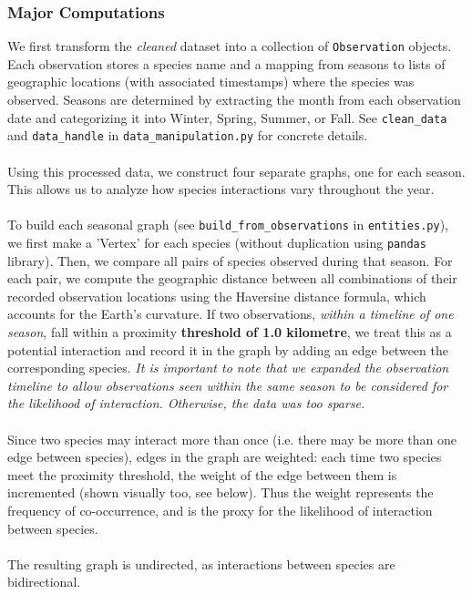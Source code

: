 \documentclass{article}
\begin{document}
\subsubsection{Major Computations}  
We first transform the \textit{cleaned} dataset into a collection of \texttt{Observation} objects. Each observation stores a species name and a mapping from seasons to lists of geographic locations (with associated timestamps) where the species was observed. Seasons are determined by extracting the month from each observation date and categorizing it into Winter, Spring, Summer, or Fall. See \texttt{clean\_data} and \texttt{data\_handle} in \texttt{data\_manipulation.py} for concrete details. \\ \\
Using this processed data, we construct four separate graphs, one for each season. This allows us to analyze how species interactions vary throughout the year.\\ \\
To build each seasonal graph (see \texttt{build\_from\_observations} in \texttt{entities.py}), we first make a 'Vertex' for each species (without duplication using \texttt{pandas} library). Then, we compare all pairs of species observed during that season. For each pair, we compute the geographic distance between all combinations of their recorded observation locations using the Haversine distance formula, which accounts for the Earth's curvature. If two observations, \textit{within a timeline of one season}, fall within a proximity \textbf{threshold of 1.0 kilometre}, we treat this as a potential interaction and record it in the graph by adding an edge between the corresponding species. \textit{It is important to note that we expanded the observation timeline to allow observations seen within the same season to be considered for the likelihood of interaction. Otherwise, the data was too sparse. } \\ \\
Since two species may interact more than once (i.e. there may be more than one edge between species), edges in the graph are weighted: each time two species meet the proximity threshold, the weight of the edge between them is incremented (shown visually too, see below). Thus the weight represents the frequency of co-occurrence, and is the proxy for the likelihood of interaction between species. \\ \\
The resulting graph is undirected, as interactions between species are bidirectional. \\ \\
\end{document}
